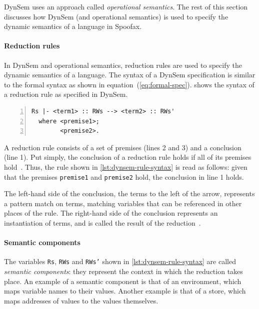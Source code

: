 DynSem uses an approach called \textit{operational semantics}. The rest of this
section discusses how DynSem (and operational semantics) is used to specify the
dynamic semantics of a language in Spoofax.

\paragraph{Reduction rules} In DynSem and operational semantics, reduction rules
are used to specify the dynamic semantics of a language. The syntax of a DynSem
specification is similar to the formal syntax as shown in
equation~(\ref{eq:formal-spec}).  shows the syntax
of a reduction rule as specified in DynSem.

\begin{minipage}[t]{\linewidth}
\begin{lstlisting}[language=dynsem,numbers=left,caption={The syntactic structure
of a reduction rule in DynSem.},label={lst:dynsem-rule-syntax}]
  Rs |- <term1> :: RWs --> <term2> :: RWs'
  where <premise1>;
        <premise2>.
\end{lstlisting}
\end{minipage}

A reduction rule consists of a set of premises (lines 2 and 3) and a conclusion
(line 1). Put simply, the conclusion of a reduction rule holds if all of its
premises hold~\cite{Kahn87}. Thus, the rule shown in
\cref{lst:dynsem-rule-syntax} is read as follows: given that the premises
\texttt{premise1} and \texttt{premise2} hold, the conclusion in line 1 holds.

The left-hand side of the conclusion, the terms to the left of the arrow,
represents a pattern match on terms, matching variables that can be referenced
in other places of the rule. The right-hand side of the conclusion represents an
instantiation of terms, and is called the result of the
reduction~\cite{VerguNV15}.

\paragraph{Semantic components} The variables \texttt{Rs}, \texttt{RWs} and
\texttt{RWs'} shown in \cref{lst:dynsem-rule-syntax} are called \textit{semantic
  components}: they represent the context in which the reduction takes place. An
example of a semantic component is that of an environment, which maps variable
names to their values. Another example is that of a store, which maps addresses
of values to the values themselves.

